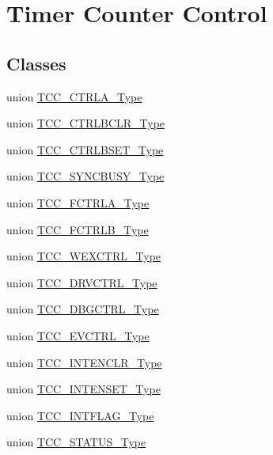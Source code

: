 \hypertarget{group___s_a_m_l21___t_c_c}{}\section{Timer Counter Control}
\label{group___s_a_m_l21___t_c_c}
\subsection*{Classes}
\begin{DoxyCompactItemize}
\item 
union \hyperlink{union_t_c_c___c_t_r_l_a___type}{T\+C\+C\+\_\+\+C\+T\+R\+L\+A\+\_\+\+Type}
\item 
union \hyperlink{union_t_c_c___c_t_r_l_b_c_l_r___type}{T\+C\+C\+\_\+\+C\+T\+R\+L\+B\+C\+L\+R\+\_\+\+Type}
\item 
union \hyperlink{union_t_c_c___c_t_r_l_b_s_e_t___type}{T\+C\+C\+\_\+\+C\+T\+R\+L\+B\+S\+E\+T\+\_\+\+Type}
\item 
union \hyperlink{union_t_c_c___s_y_n_c_b_u_s_y___type}{T\+C\+C\+\_\+\+S\+Y\+N\+C\+B\+U\+S\+Y\+\_\+\+Type}
\item 
union \hyperlink{union_t_c_c___f_c_t_r_l_a___type}{T\+C\+C\+\_\+\+F\+C\+T\+R\+L\+A\+\_\+\+Type}
\item 
union \hyperlink{union_t_c_c___f_c_t_r_l_b___type}{T\+C\+C\+\_\+\+F\+C\+T\+R\+L\+B\+\_\+\+Type}
\item 
union \hyperlink{union_t_c_c___w_e_x_c_t_r_l___type}{T\+C\+C\+\_\+\+W\+E\+X\+C\+T\+R\+L\+\_\+\+Type}
\item 
union \hyperlink{union_t_c_c___d_r_v_c_t_r_l___type}{T\+C\+C\+\_\+\+D\+R\+V\+C\+T\+R\+L\+\_\+\+Type}
\item 
union \hyperlink{union_t_c_c___d_b_g_c_t_r_l___type}{T\+C\+C\+\_\+\+D\+B\+G\+C\+T\+R\+L\+\_\+\+Type}
\item 
union \hyperlink{union_t_c_c___e_v_c_t_r_l___type}{T\+C\+C\+\_\+\+E\+V\+C\+T\+R\+L\+\_\+\+Type}
\item 
union \hyperlink{union_t_c_c___i_n_t_e_n_c_l_r___type}{T\+C\+C\+\_\+\+I\+N\+T\+E\+N\+C\+L\+R\+\_\+\+Type}
\item 
union \hyperlink{union_t_c_c___i_n_t_e_n_s_e_t___type}{T\+C\+C\+\_\+\+I\+N\+T\+E\+N\+S\+E\+T\+\_\+\+Type}
\item 
union \hyperlink{union_t_c_c___i_n_t_f_l_a_g___type}{T\+C\+C\+\_\+\+I\+N\+T\+F\+L\+A\+G\+\_\+\+Type}
\item 
union \hyperlink{union_t_c_c___s_t_a_t_u_s___type}{T\+C\+C\+\_\+\+S\+T\+A\+T\+U\+S\+\_\+\+Type}

\end{DoxyCompactItemize}
